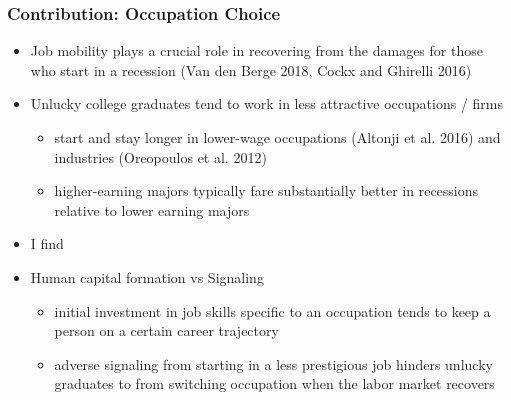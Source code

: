 \documentclass[11pt]{beamer}
\begin{document}
\begin{frame}
	\frametitle{Contribution: Occupation Choice} 
	\begin{itemize}
		\item Job mobility plays a crucial role in recovering from the damages for those who start in a recession (Van den Berge 2018, Cockx and Ghirelli 2016) 
		\item Unlucky college graduates tend to work in less attractive occupations / firms
		\begin{itemize}
			\item start and stay longer in lower-wage occupations (Altonji et al. 2016) and industries (Oreopoulos et al.
			2012)
			\item higher-earning majors typically fare substantially
			better in recessions relative to lower earning majors
		\end{itemize}
		\item I find 
		\item Human capital formation vs Signaling 
			\begin{itemize}
				\item initial investment in job skills specific to an occupation tends to keep a person on a certain career trajectory
				\item adverse signaling from starting in a less prestigious job hinders unlucky graduates to from switching occupation when the labor market recovers
			\end{itemize}		
	\end{itemize}
\end{frame}


\end{document}
